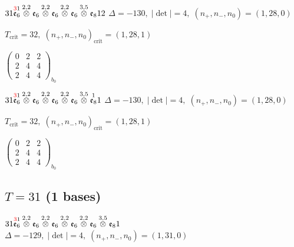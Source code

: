\documentclass[10pt]{article}
\begin{document}
$31\overset{\textcolor{red}{3}1}{\mathfrak{e}_6}\overset{2,2}{\otimes}\mathfrak{e}_6\overset{2,2}{\otimes}\mathfrak{e}_6\overset{2,2}{\otimes}\mathfrak{e}_6\overset{3,5}{\otimes}\mathfrak{e}_812$ \quad $\Delta=-130,\; |\det|=4,\; (n_+,n_-,n_0)=(1,28,0)$

\hspace{1em}$T_{\text{crit}}=32,\; (n_+,n_-,n_0)_{\text{crit}}=(1,28,1)$

\hspace{2em}$\left(\begin{smallmatrix}0 & 2 & 2 \\ 2 & 4 & 4 \\ 2 & 4 & 4\end{smallmatrix}\right)_{\!b_0}$

\smallskip

$31\overset{\textcolor{red}{3}1}{\mathfrak{e}_6}\overset{2,2}{\otimes}\mathfrak{e}_6\overset{2,2}{\otimes}\mathfrak{e}_6\overset{2,2}{\otimes}\mathfrak{e}_6\overset{3,5}{\otimes}\overset{1}{\mathfrak{e}_8}1$ \quad $\Delta=-130,\; |\det|=4,\; (n_+,n_-,n_0)=(1,28,0)$

\hspace{1em}$T_{\text{crit}}=32,\; (n_+,n_-,n_0)_{\text{crit}}=(1,28,1)$

\hspace{2em}$\left(\begin{smallmatrix}0 & 2 & 2 \\ 2 & 4 & 4 \\ 2 & 4 & 4\end{smallmatrix}\right)_{\!b_0}$


\subsection*{$T = 31$ \quad (1 bases)}
\smallskip

$31\overset{\textcolor{red}{3}1}{\mathfrak{e}_6}\overset{2,2}{\otimes}\mathfrak{e}_6\overset{2,2}{\otimes}\mathfrak{e}_6\overset{2,2}{\otimes}\mathfrak{e}_6\overset{2,2}{\otimes}\mathfrak{e}_6\overset{3,5}{\otimes}\mathfrak{e}_81$ \quad $\Delta=-129,\; |\det|=4,\; (n_+,n_-,n_0)=(1,31,0)$
\end{document}
